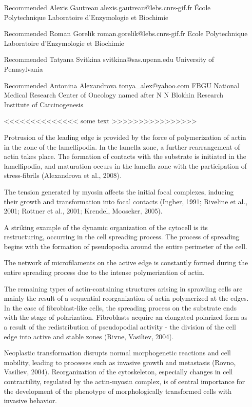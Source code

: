 \documentclass[num-refs]{wiley-article}
\begin{document}
Recommended
Alexis Gautreau
alexis.gautreau@lebs.cnrs-gif.fr
École Polytechnique
Laboratoire d'Enzymologie et Biochimie

Recommended
Roman Gorelik
roman.gorelik@lebs.cnrs-gif.fr
Ecole Polytechnique
Laboratoire d'Enzymologie et Biochimie

Recommended
Tatyana Svitkina
svitkina@sas.upenn.edu
University of Pennsylvania

Recommended
Antonina Alexandrova
tonya_alex@yahoo.com
FBGU National Medical Research Center of Oncology named after N N Blokhin Research Institute of Carcinogenesis

<<<<<<<<<<<<<< some text >>>>>>>>>>>>>>>>

Protrusion of the leading edge is provided by the force of polymerization of actin in the zone of the lamellipodia. In the lamella zone, a further rearrangement of actin takes place.
The formation of contacts with the substrate is initiated in the lamellipodia, and maturation occurs in the lamella zone with the participation of stress-fibrils (Alexandrova et al., 2008).

The tension generated by myosin affects the initial focal complexes, inducing their growth and transformation into focal contacts (Ingber, 1991; Riveline et al., 2001; Rottner et al., 2001; Krendel, Mooseker, 2005).

A striking example of the dynamic organization of the cytocell is its restructuring, occurring in the cell spreading process.
The process of spreading begins with the formation of pseudopodia around the entire perimeter of the cell.

The network of microfilaments on the active edge is constantly formed during the entire spreading process due to the intense polymerization of actin.

The remaining types of actin-containing structures arising in sprawling cells are mainly the result of a sequential reorganization of actin polymerized at the edges.
In the case of fibroblast-like cells, the spreading process on the substrate ends with the stage of polarization. Fibroblasts acquire an elongated polarized form as a result of the redistribution of pseudopodial activity - the division of the cell edge into active and stable zones (Rivne, Vasiliev, 2004).

Neoplastic transformation disrupts normal morphogenetic reactions and cell mobility, leading to processes such as invasive growth and metastasis (Rovno, Vasiliev, 2004).
Reorganization of the cytoskeleton, especially changes in cell contractility, regulated by the actin-myosin complex, is of central importance for the development of the phenotype of morphologically transformed cells with invasive behavior.
\end{document}
